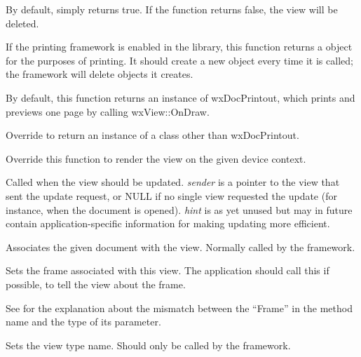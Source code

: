 By default, simply returns true. If the function returns false, the
view will be deleted.

\label{wxviewoncreateprintout}


If the printing framework is enabled in the library, this function returns a
\rtfsp{} object for the purposes of printing. It should create a new object
every time it is called; the framework will delete objects it creates.

By default, this function returns an instance of wxDocPrintout, which prints
and previews one page by calling wxView::OnDraw.

Override to return an instance of a class other than wxDocPrintout.

\label{onviewondraw}


Override this function to render the view on the given device context.

\label{onviewonupdate}


Called when the view should be updated. {\it sender} is a pointer to the view
that sent the update request, or NULL if no single view requested the update (for instance,
when the document is opened). {\it hint} is as yet unused but may in future contain
application-specific information for making updating more efficient.

\label{wxviewsetdocument}


Associates the given document with the view. Normally called by the
framework.

\label{wxviewsetframe}


Sets the frame associated with this view. The application should call this
if possible, to tell the view about the frame.

See  for the explanation about the mismatch
between the ``Frame'' in the method name and the type of its parameter.

\label{wxviewsetviewname}


Sets the view type name. Should only be called by the framework.


